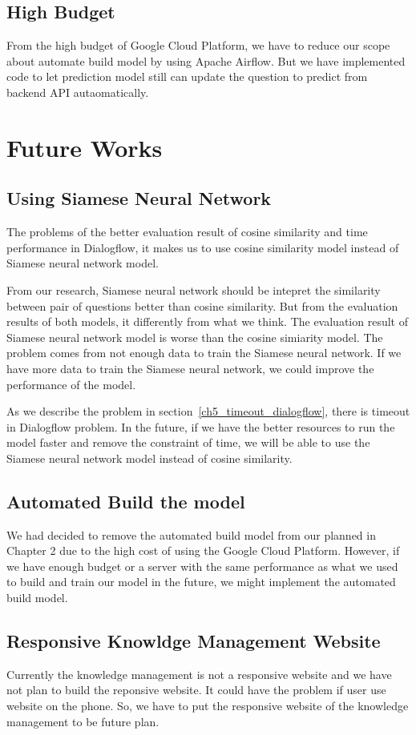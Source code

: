\documentclass[12pt,oneside,openright,a4paper]{cpe-english-project}
\begin{document}
\subsection{High Budget}
From the high budget of Google Cloud Platform, we have to reduce our scope about automate build model
by using Apache Airflow. But we have implemented code to let prediction model still can update the
question to predict from backend API autaomatically.

\section{Future Works}
\subsection{Using Siamese Neural Network}
The problems of the better evaluation result of cosine similarity and time performance in Dialogflow,
it makes us to use cosine similarity model instead of Siamese neural network model.

From our research, Siamese neural network should be intepret the similarity between pair of questions
better than cosine similarity. But from the evaluation results of both models, it differently from what we think.
The evaluation result of Siamese neural network model is worse than the cosine simiarity model.
The problem comes from not enough data to train the Siamese neural network.
If we have more data to train the Siamese neural network, we could improve the performance of the model.

As we describe the problem in section~\ref*{ch5_timeout_dialogflow}, there is timeout in Dialogflow problem.
In the future, if we have the better resources to run the model faster and remove the constraint of time,
we will be able to use the Siamese neural network model instead of cosine similarity.

\subsection{Automated Build the model}
We had decided to remove the automated build model from our planned in Chapter 2
due to the high cost of using the Google Cloud Platform.
However, if we have enough budget or a server with the same performance
as what we used to build and train our model in the future,
we might implement the automated build model.

\subsection{Responsive Knowldge Management Website}
Currently the knowledge management is not a responsive website and we have not plan to build the reponsive website.
It could have the problem if user use website on the phone.
So, we have to put the responsive website of the knowledge management to be future plan.
\end{document}
